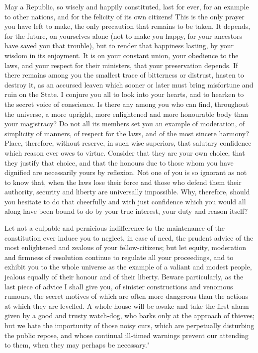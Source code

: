 \documentclass[12pt]{report}
\begin{document}
May a Republic, so wisely and happily constituted, last for ever, for an example to other nations, and for the felicity of its own citizens! This is the only prayer you have left to make, the only precaution that remains to be taken. It depends, for the future, on yourselves alone (not to make you happy, for your ancestors have saved you that trouble), but to render that happiness lasting, by your wisdom in its enjoyment. It is on your constant union, your obedience to the laws, and your respect for their ministers, that your preservation depends. If there remains among you the smallest trace of bitterness or distrust, hasten to destroy it, as an accursed leaven which sooner or later must bring misfortune and ruin on the State. I conjure you all to look into your hearts, and to hearken to the secret voice of conscience. Is there any among you who can find, throughout the universe, a more upright, more enlightened and more honourable body than your magistracy? Do not all its members set you an example of moderation, of simplicity of manners, of respect for the laws, and of the most sincere harmony? Place, therefore, without reserve, in such wise superiors, that salutary confidence which reason ever owes to virtue. Consider that they are your own choice, that they justify that choice, and that the honours due to those whom you have dignified are necessarily yours by reflexion. Not one of you is so ignorant as not to know that, when the laws lose their force and those who defend them their authority, security and liberty are universally impossible. Why, therefore, should you hesitate to do that cheerfully and with just confidence which you would all along have been bound to do by your true interest, your duty and reason itself?

Let not a culpable and pernicious indifference to the maintenance of the constitution ever induce you to neglect, in case of need, the prudent advice of the most enlightened and zealous of your fellow-citizens; but let equity, moderation and firmness of resolution continue to regulate all your proceedings, and to exhibit you to the whole universe as the example of a valiant and modest people, jealous equally of their honour and of their liberty. Beware particularly, as the last piece of advice I shall give you, of sinister constructions and venomous rumours, the secret motives of which are often more dangerous than the actions at which they are levelled. A whole house will be awake and take the first alarm given by a good and trusty watch-dog, who barks only at the approach of thieves; but we hate the importunity of those noisy curs, which are perpetually disturbing the public repose, and whose continual ill-timed warnings prevent our attending to them, when they may perhaps be necessary."
\end{document}
